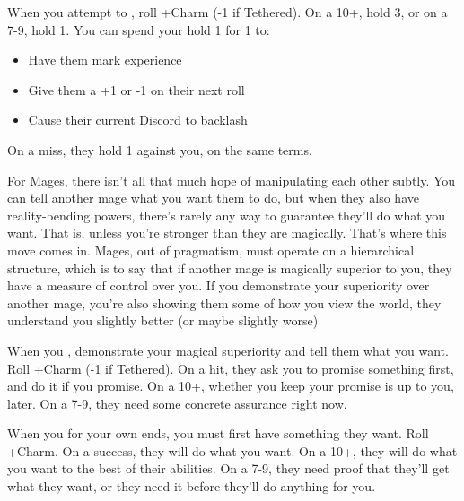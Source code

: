 \begin{multicols}{3}
  \begin{move}
    When you attempt to , roll +Charm (-1 if Tethered). On a 10+, hold
    3, or on a 7-9, hold 1. You can spend your hold 1 for 1 to:
    \begin{itemize}
      \setlength\itemsep{-.5em}
    \item Have them mark experience
    \item Give them a +1 or -1 on their next roll
    \item Cause their current Discord to backlash
    \end{itemize}
    On a miss, they hold 1 against you, on the same terms.
\begin{movedetail}
  For Mages, there isn't all that much hope of manipulating each other
  subtly. You can tell another mage what you want them to do, but when
  they also have reality-bending powers, there's rarely any way to
  guarantee they'll do what you want. That is, unless you're stronger
  than they are magically. That's where this move comes in. Mages, out
  of pragmatism, must operate on a hierarchical structure, which is to
  say that if another mage is magically superior to you, they have a
  measure of control over you. If you demonstrate your superiority
  over another mage, you're also showing them some of how you view the
  world, they understand you slightly better (or maybe slightly worse)
\end{movedetail}
  \end{move}

  \SEPARATOR

  \begin{move}
    When you ,
    demonstrate your magical superiority and tell them what you
    want. Roll +Charm (-1 if Tethered). On a hit, they ask you to
    promise something first, and do it if you promise. On a 10+,
    whether you keep your promise is up to you, later. On a 7-9, they
    need some concrete assurance right now.
  \end{move}

  \SEPARATOR

  \begin{move}
    When you  for your own ends, you must first
    have something they want. Roll +Charm. On a success, they will do
    what you want. On a 10+, they will do what you want to the best of
    their abilities. On a 7-9, they need proof that they'll get what
    they want, or they need it before they'll do anything for you.
  \end{move}


\end{multicols}
